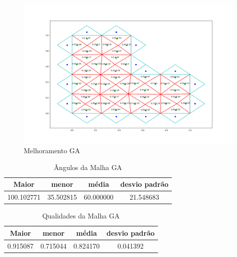 \begin{figure}[ht]
    \centering
    \includegraphics[width=1\linewidth]{fig/malha-ga.png}
    \caption{Melhoramento GA}
    \label{fig:malha-ga}
\end{figure}

\begin{table}[hb]
\centering
\par\caption{Ângulos da Malha GA}
\begin{tabular}{c|c|c|c}
Maior&menor&média&desvio padrão\\\hline\hline
100.102771&35.502815&60.000000&21.548683\\\hline
\end{tabular}
\label{tab:angulos-malha-ga}
\end{table}

\begin{table}[hb]
\centering
\par\caption{Qualidades da Malha GA}
\begin{tabular}{c|c|c|c}
Maior&menor&média&desvio padrão\\\hline\hline
0.915087&0.715044&0.824170&0.041392\\\hline
\end{tabular}
\label{tab:qualidades-malha-ga}
\end{table}